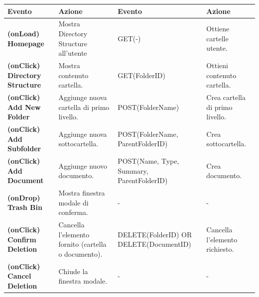 \documentclass[aspectratio=169, dvipsnames]{beamer}
\begin{document}
\begin{frame}
\begin{table}[h!]
{\begin{tabular}{|ll|ll|}
                \multicolumn{1}{|l|}{{\textbf{Evento}}}                      & {\textbf{Azione}}                                   & \multicolumn{1}{l|}{{\textbf{Evento}}}                         & {\textbf{Azione}}               \\ \hline
                \multicolumn{1}{|l|}{\textbf{(onLoad) Homepage}}             & Mostra Directory Structure all'utente               & \multicolumn{1}{l|}{GET(-)}                                    & Ottiene cartelle utente.        \\ \hline
                \multicolumn{1}{|l|}{\textbf{(onClick) Directory Structure}} & Mostra contenuto cartella.                          & \multicolumn{1}{l|}{GET(FolderID)}                             & Ottieni contenuto cartella.     \\ \hline
                \multicolumn{1}{|l|}{\textbf{(onClick) Add New Folder}}      & Aggiunge nuova cartella di primo livello.           & \multicolumn{1}{l|}{POST(FolderName)}                          & Crea cartella di primo livello. \\ \hline
                \multicolumn{1}{|l|}{\textbf{(onClick) Add Subfolder}}       & Aggiunge nuova sottocartella.                       & \multicolumn{1}{l|}{POST(FolderName, ParentFolderID)}          & Crea sottocartella.             \\ \hline
                \multicolumn{1}{|l|}{\textbf{(onClick) Add Document}}        & Aggiunge nuovo documento.                           & \multicolumn{1}{l|}{POST(Name, Type, Summary, ParentFolderID)} & Crea documento.                 \\ \hline
                \multicolumn{1}{|l|}{\textbf{(onDrop) Trash Bin}}            & Mostra finestra modale di conferma.                 & \multicolumn{1}{l|}{-}                                         & -                               \\ \hline
                \multicolumn{1}{|l|}{\textbf{(onClick) Confirm Deletion}}    & Cancella l'elemento fornito (cartella o documento). & \multicolumn{1}{l|}{DELETE(FolderID) OR DELETE(DocumentID)}    & Cancella l'elemento richiesto.  \\ \hline
                \multicolumn{1}{|l|}{\textbf{(onClick) Cancel Deletion}}     & Chiude la finestra modale.                          & \multicolumn{1}{l|}{-}                                         & -                               \\ \hline
            \end{tabular}
        }
    \end{table}
\end{frame}
\end{document}

